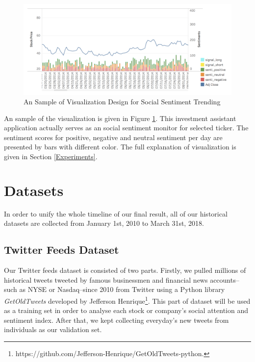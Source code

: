 \documentclass[conference]{IEEEtran}
\begin{document}
\begin{figure}[H]
\centering
\includegraphics[width=\columnwidth]{pics/visualsample.png}
\caption{An Sample of Visualization Design for Social Sentiment Trending}
\label{visualsample}
\end{figure}
An sample of the visualization is given in Figure \ref{visualsample}. This investment assistant application actually serves as an social sentiment monitor for selected ticker. The sentiment scores for positive, negative and neutral sentiment per day are presented by bars with different color. The full explanation of visualization is given in Section \ref{Experiments}.
\vspace{1.0em}

\section{Datasets}\label{Datasets}
In order to unify the whole timeline of our final result, all of our historical datasets are collected from January 1st, 2010 to March 31st, 2018.
\vspace{0.5em}

\subsection{Twitter Feeds Dataset}
Our Twitter feeds dataset is consisted of two parts. Firstly, we pulled millions of historical tweets tweeted by famous businessmen and financial news accounts--such as NYSE or Nasdaq--since 2010 from Twitter using a Python library \textit{GetOldTweets} developed by Jefferson Henrique\footnote{https://github.com/Jefferson-Henrique/GetOldTweets-python.}. This part of dataset will be used as a training set in order to analyse each stock or company’s social attention and sentiment index. After that, we kept collecting everyday’s new tweets from individuals as our validation set.
\end{document}
